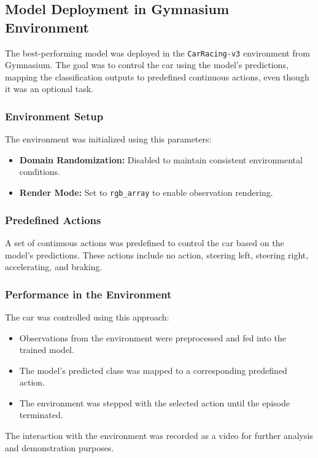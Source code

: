 \documentclass{article}
\begin{document}
\subsection{Model Deployment in Gymnasium Environment}

The best-performing model was deployed in the \texttt{CarRacing-v3} environment from Gymnasium. The goal was to control the car using the model's predictions, mapping the classification outputs to predefined continuous actions, even though it was an optional task.

\subsubsection{Environment Setup}

The environment was initialized using this parameters:
\begin{itemize}
    \item \textbf{Domain Randomization:} Disabled to maintain consistent environmental conditions.
    \item \textbf{Render Mode:} Set to \texttt{rgb\_array} to enable observation rendering.
\end{itemize}

\subsubsection{Predefined Actions}
A set of continuous actions was predefined to control the car based on the model's predictions. These actions include no action, steering left, steering right, accelerating, and braking.

\subsubsection{Performance in the Environment}

The car was controlled using this approach:
\begin{itemize}
    \item Observations from the environment were preprocessed and fed into the trained model.
    \item The model's predicted class was mapped to a corresponding predefined action.
    \item The environment was stepped with the selected action until the episode terminated.
\end{itemize}

\noindent
The interaction with the environment was recorded as a video for further analysis and demonstration purposes.
\end{document}

